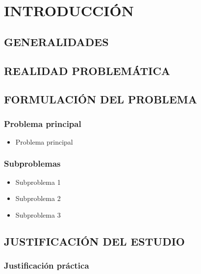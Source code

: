 \chapter{INTRODUCCIÓN}
\section{GENERALIDADES}

\lipsum[1]


\section{REALIDAD PROBLEMÁTICA}

\lipsum[3]

\section{FORMULACIÓN DEL PROBLEMA}

\subsection{Problema principal}

\begin{itemize}
  \item Problema principal
\end{itemize}

\subsection{Subproblemas}

\begin{itemize}
  \item Subproblema 1
  \item Subproblema 2
  \item Subproblema 3
\end{itemize}

\section{JUSTIFICACIÓN DEL ESTUDIO}

\subsection{Justificación práctica}

\lipsum[4]

